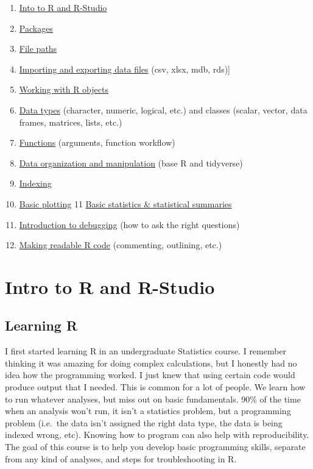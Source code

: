 \documentclass[
]{book}
\providecommand{\tightlist}{%
  \setlength{\itemsep}{0pt}\setlength{\parskip}{0pt}}
\begin{document}
\begin{enumerate}
\def\labelenumi{\arabic{enumi}.}
\tightlist
\item
  \hyperref[intro]{Into to R and R-Studio}
\item
  \hyperref[Packages]{Packages}
\item
  \hyperref[FilePaths]{File paths}
\item
  \hyperref[ImportExport]{Importing and exporting data files} (csv, xlsx, mdb, rds){]}
\item
  \hyperref[RObjects]{Working with R objects}
\item
  \hyperref[DataTypes]{Data types} (character, numeric, logical, etc.) and classes (scalar, vector, data frames, matrices, lists, etc.)
\item
  \hyperref[Functions]{Functions} (arguments, function workflow)
\item
  \hyperref[DataOrg]{Data organization and manipulation} (base R and tidyverse)
\item
  \hyperref[Index]{Indexing}
\item
  \hyperref[Plotting]{Basic plotting}
  11 \hyperref[Stats]{Basic statistics \& statistical summaries}
\item
  \hyperref[debugging]{Introduction to debugging} (how to ask the right questions)
\item
  \hyperref[ReadableR]{Making readable R code} (commenting, outlining, etc.)
\end{enumerate}

\chapter{Intro to R and R-Studio}\label{intro}

\section{Learning R}\label{learning-r}

I first started learning R in an undergraduate Statistics course. I remember
thinking it was amazing for doing complex calculations, but I honestly
had no idea how the programming worked. I just knew that using certain code would produce output that I needed. This is common for a lot of people. We learn how to run whatever analyses, but miss out on basic fundamentals. 90\% of the time when an analysis won't run, it isn't a statistics problem, but a programming problem (i.e.~the data isn't assigned the right data type, the data is being indexed wrong, etc). Knowing how to program can also help with reproducibility. The goal of this course is to help you develop basic programming skills, separate from any kind of analyses, and steps for troubleshooting in R.
\end{document}
